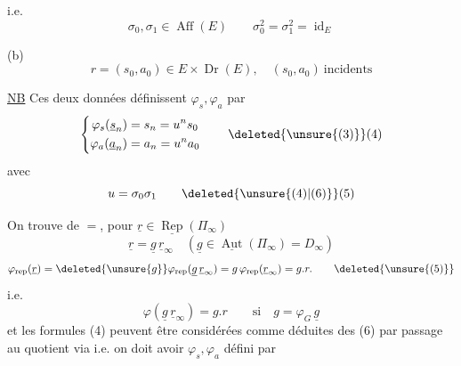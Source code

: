 i.e.
\[ \boxed{\sigma_0,\sigma_1\in\operatorname{Aff}(E)\qquad \sigma_0^2=\sigma_1^2=\operatorname{id}_E} \tag*{(2)} \]

(b)
\[ \boxed{r=(s_0,a_0)\in E\times\operatorname{Dr}(E),\quad(s_0,a_0)\ \text{incidents}} \tag*{(3)} \]

\uline{NB} Ces deux données définissent $\varphi_s,\varphi_a$ par
\[ \left\{\begin{aligned}\varphi_s(\underline{s}_n)&=s_n=u^n s_0\\
\varphi_a(\underline{a}_n)&=a_n=u^n a_0\end{aligned}\right. \tag*{\deleted{\unsure{(3)}}(4)} \]
avec
\[ u=\sigma_0\sigma_1 \tag*{\deleted{\unsure{(4)|(6)}}(5)} \]

On trouve de $=$, pour $\underline r\in\underline{\operatorname{Rep}}(\Pi_\infty)$
\[ \underline r=\underline g\,\underline r_\infty\quad(\underline g\in\underline{\operatorname{Aut}}(\Pi_\infty)=D_\infty) \]
\[ \varphi_{\mathrm{rep}}(\underline r)=\deleted{\unsure{g}}\varphi_{\mathrm{rep}}(\underline g\,\underline r_\infty)=g\,\varphi_{\mathrm{rep}}(\underline r_\infty)=g.r. \tag*{\deleted{\unsure{(5)}}} \]
i.e.
\[ \varphi(\underline g\,\underline r_\infty)=g.r\qquad\text{si}\quad g=\varphi_G\,\underline g \tag*{(6)} \]
et les formules (4)  peuvent être
considérées comme déduites des  (6)
par passage au quotient via
i.e. on doit avoir $\varphi_s,\varphi_a$ défini par
